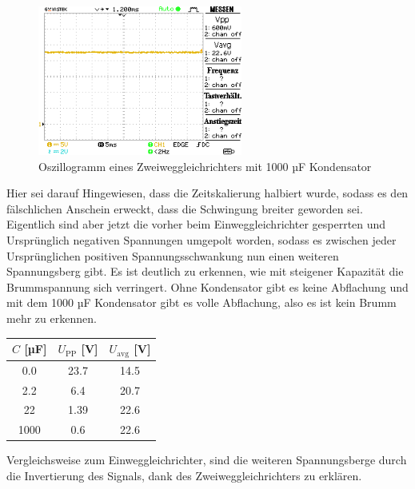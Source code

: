 \documentclass[a4paper,10pt]{article}
\numberwithin{equation}{section}
\begin{document}
\begin{figure}[h]
	\centering
	\includegraphics[width=0.6\textwidth]{data/a4_d.BMP.png}
	\caption{Oszillogramm eines Zweiweggleichrichters mit 1000 µF Kondensator}
	\label{fig:4.4}
\end{figure}
Hier sei darauf Hingewiesen, dass die Zeitskalierung halbiert wurde, sodass es den fälschlichen Anschein erweckt, dass die Schwingung breiter geworden sei. Eigentlich sind aber jetzt die vorher beim Einweggleichrichter gesperrten und Ursprünglich negativen Spannungen umgepolt worden, sodass es zwischen jeder Ursprünglichen positiven Spannungsschwankung nun einen weiteren Spannungsberg gibt.
Es ist deutlich zu erkennen, wie mit steigener Kapazität die Brummspannung sich verringert. Ohne Kondensator gibt es keine Abflachung und mit dem 1000 µF Kondensator gibt es volle Abflachung, also es ist kein Brumm mehr zu erkennen.

\begin{center}
	\begin{tabular}{|c|c|c|}
		\hline
    \(C \) [µF] & \(U_{\text{PP}}\) [V] & \(U_{\text{avg}}\) [V]\\
		\hline
    0.0 & 23.7 & 14.5\\
    2.2 & 6.4 & 20.7 \\
    22 & 1.39 & 22.6 \\
    1000 & 0.6 & 22.6 \\
		\hline
	\end{tabular}
	\label{Tab:1.3}
\end{center}

Vergleichsweise zum Einweggleichrichter, sind die weiteren Spannungsberge durch die Invertierung des Signals, dank des Zweiweggleichrichters zu erklären.
\end{document}
